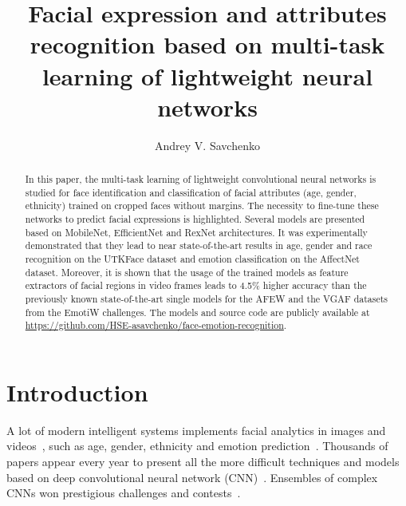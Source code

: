 \documentclass[runningheads]{llncs}
\begin{document}
\title{Facial expression and attributes recognition based on multi-task learning of lightweight neural networks}
\author{Andrey V. Savchenko}
\maketitle \begin{abstract}
In this paper, the multi-task learning of lightweight convolutional neural networks is studied for face identification and classification of facial attributes (age, gender, ethnicity) trained on cropped faces without margins. The necessity to fine-tune these networks to predict facial expressions is highlighted. Several models are presented based on MobileNet, EfficientNet and RexNet architectures. It was experimentally demonstrated that they lead to near state-of-the-art results in age, gender and race recognition on the UTKFace dataset and emotion classification on the AffectNet dataset. Moreover, it is shown that the usage of the trained models as feature extractors of facial regions in video frames leads to 4.5\% higher accuracy than the previously known state-of-the-art single models for the AFEW and the VGAF datasets from the EmotiW challenges. The models and source code are publicly available at \url{https://github.com/HSE-asavchenko/face-emotion-recognition}.

\end{abstract}
\section{Introduction}\label{sec:1}
A lot of modern intelligent systems implements facial analytics in images and videos~\cite{savchenko2018granular}, such as age, gender, ethnicity and emotion prediction~\cite{wang2021multi,mollahosseini2017affectnet}. Thousands of papers appear every year to present all the more difficult techniques and models based on deep convolutional neural network (CNN)~\cite{zhao2021computational}. Ensembles of complex CNNs won prestigious challenges and contests~\cite{bargal2016emotion,liu2020group}. 
\end{document}

